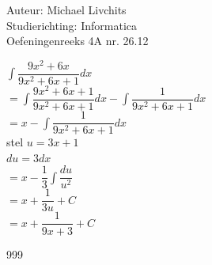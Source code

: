 \documentclass[a4paper]{article}
\begin{document}
  
\noindent \large Auteur: Michael Livchits \\
\noindent \large Studierichting: Informatica\\
\noindent \large Oefeningenreeks 4A nr. 26.12\\

\medskip

\normalsize

$\displaystyle\int\dfrac{9x^2+6x}{9x^2+6x+1}dx$\\

$= \displaystyle\int\dfrac{9x^2+6x+1}{9x^2+6x+1}dx- \displaystyle\int\dfrac{1}{9x^2+6x+1}dx$\\

$= x -\displaystyle\int\dfrac{1}{9x^2+6x+1}dx$\\

stel $u = 3x+1$\\

$du = 3dx$\\

$= x -\dfrac{1}{3}\displaystyle\int\dfrac{du}{u^2}$\\

$= x + \dfrac{1}{3u} + C$\\

$= x + \dfrac{1}{9x+3} + C$\\

\begin{thebibliography}{999}
\end{thebibliography}
\end{document}
